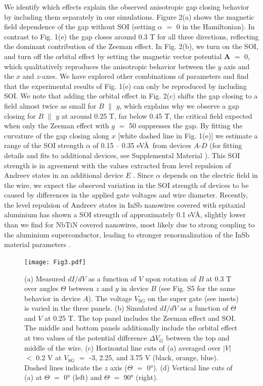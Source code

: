 We identify which effects explain the observed anisotropic gap closing behavior by including them separately in our simulations.
Figure 2(a) shows the magnetic field dependence of the gap without SOI (setting $\alpha$ $=$ 0 in the Hamiltonian).
In contrast to Fig. 1(e) the gap closes around 0.3 T for all three directions, reflecting the dominant contribution of the Zeeman effect.
In Fig. 2(b), we turn on the SOI, and turn off the orbital effect by setting the magnetic vector potential $\mathbf{A}$ $=$ 0, which qualitatively reproduces the anisotropic behavior between the $y$ axis and the $x$ and $z$-axes.
We have explored other combinations of parameters and find that the experimental results of Fig. 1(e) can only be reproduced by including SOI.
We note that adding the orbital effect in Fig. 2(c) shifts the gap closing to a field almost twice as small for $B$ $\parallel$ $y$, which explains why we observe a gap closing for $B$ $\parallel$ $y$ at around 0.25 T, far below 0.45 T, the critical field expected when only the Zeeman effect with $g$ $=$ 50 suppresses the gap.
By fitting the curvature of the gap closing \cite{VanHeck,Pan2018} along $x$ [white dashed line in Fig. 1(e)] we estimate a range of the SOI strength $\alpha$ of 0.15 -- 0.35 eV\AA\ from devices $A$-$D$ (for fitting details and fits to additional devices, see Supplemental Material \cite{Note1}).
This SOI strength is in \mbox{agreement} with the values extracted from level repulsion of Andreev states \cite{Stanescu2013,DeMoor2018} in an additional device $E$ \cite{Note1}.
\mbox{Since} $\alpha$ depends on the electric field in the wire, we expect the observed variation in the SOI strength of devices to be caused by differences in the applied gate voltages and wire diameter.
Recently, the level repulsion of Andreev states in InSb nanowires covered with epitaxial aluminium has shown a SOI strength of approximately 0.1 eV\AA \cite{DeMoor2018}, slightly lower than we find for NbTiN covered nanowires, most likely due to strong coupling to the aluminium superconductor, leading to stronger renormalization of the InSb material parameters \cite{Stanescu2011,Cole2015,Antipov2018,Woods2018,Mikkelsen2018,Reeg2018}.
\begin{figure}
\texttt{[image: Fig3.pdf]}
\caption{\label{fig3}
(a) Measured $dI/dV$ as a function of $V$ upon rotation of $B$ at 0.3 T over angles $\Theta$ between $z$ and $y$ in device $B$ (see Fig. S5 \cite{Note1} for the same behavior in device $A$).
The voltage $V_{\mathrm{SG}}$ on the super gate (see insets) is varied in the three panels.
(b) Simulated $dI/dV$ as a function of $\Theta$ and $V$ at 0.25 T.
The top panel includes the Zeeman effect and SOI.
The middle and bottom panels additionally include the orbital effect at two values of the potential difference $\Delta V_G$ between the top and middle of the wire.
(c) Horizontal line cuts of (a) averaged over $|V|$ $<$ 0.2 V at $V_{\mathrm{SG}}$ $=$ -3,  2.25, and 3.75 V (black, orange, blue).
Dashed lines indicate the $z$ axis ($\Theta$ $=$ \ang{0}).
(d) Vertical line cuts of (a) at $\Theta$ $=$ \ang{0} (left) and $\Theta$ $=$ \ang{90} (right).
}
\end{figure}

